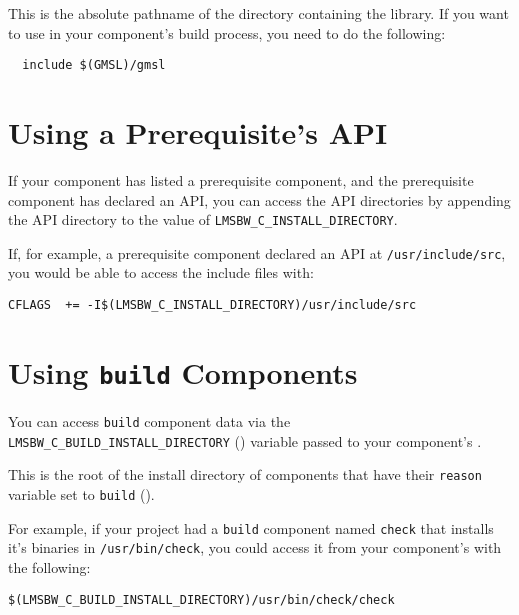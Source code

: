 This is the absolute pathname of the directory containing the \gmsl
library.  If you want to use \gmsl in your component's build process,
you need to do the following:

\begin{verbatim}
  include $(GMSL)/gmsl
\end{verbatim}

\section{Using a Prerequisite's API}\label{wrap:using-prerequisite-api}

If your component has listed a prerequisite component, and the
prerequisite component has declared an API, you can access the API
directories by appending the API directory to the value of
\texttt{LMSBW\_C\_INSTALL\_DIRECTORY}.

If, for example, a prerequisite component declared an API at
\texttt{/usr/include/src}, you would be able to access the
include files with:

\begin{verbatim}
CFLAGS  += -I$(LMSBW_C_INSTALL_DIRECTORY)/usr/include/src
\end{verbatim}

\section{Using \texttt{build} Components}\label{wrap:using-build-components}

You can access \texttt{build} component data via the
\texttt{LMSBW\_C\_BUILD\_INSTALL\_DIRECTORY}
() variable passed to your
component's \makefile.

This is the root of the install directory of components that have
their \texttt{reason} variable set to \texttt{build}
().

For example, if your project had a \texttt{build} component named
\texttt{check} that installs it's binaries in
\texttt{/usr/bin/check}, you could access it from your
component's \makefile with the following:

\begin{verbatim}
$(LMSBW_C_BUILD_INSTALL_DIRECTORY)/usr/bin/check/check
\end{verbatim}
